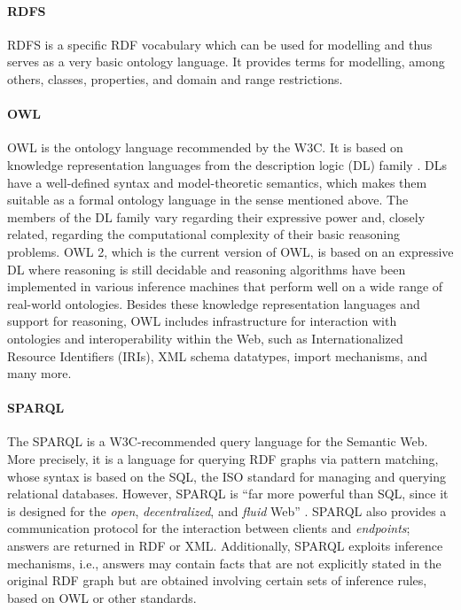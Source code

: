 \paragraph{RDFS}
\gls{RDFS} is a specific \gls{RDF} vocabulary which can be used for modelling
and thus serves as a very basic ontology language.
It provides terms for modelling, among others, classes, properties, and domain and range restrictions.

\paragraph{OWL}
%
\gls{OWL} is the ontology language recommended by the W3C.
It is based on knowledge representation languages from the description logic (DL) family \autocite{Baader2017}.
DLs have a well-defined syntax and model-theoretic semantics, which makes them suitable
as a formal ontology language in the sense mentioned above.
The members of the DL family vary regarding their expressive power and,
closely related, regarding the computational complexity of their basic reasoning problems.
OWL 2, which is the current version of OWL,
is based on an expressive DL where reasoning is still decidable and reasoning algorithms have been implemented
in various inference machines that perform well on a wide range of real-world ontologies.
Besides these knowledge representation languages and support for reasoning,
OWL includes infrastructure for interaction with ontologies and interoperability
within the Web, such as Internationalized Resource Identifiers (IRIs),
%
\gls{XML} schema datatypes, import mechanisms, and many more.

\paragraph{SPARQL}
The \gls{SPARQL} is a W3C-recommended query language for the Semantic Web.
More precisely, it is a language for querying \gls{RDF} graphs via pattern matching,
whose syntax is based on the \gls{SQL}, the ISO standard for managing and querying relational databases.
However, SPARQL is \enquote{far more powerful than SQL, since it is designed for the \emph{open}, \emph{decentralized}, and \emph{fluid} Web} \autocite{DellaValle2011}.
SPARQL also provides a communication protocol for the interaction between clients and \emph{endpoints};
answers are returned in \gls{RDF} or \gls{XML}.
Additionally, SPARQL exploits inference mechanisms,
i.e., answers may contain facts that are not explicitly stated in the original \gls{RDF} graph
but are obtained involving certain sets of inference rules, based on \gls{OWL} or other standards.

